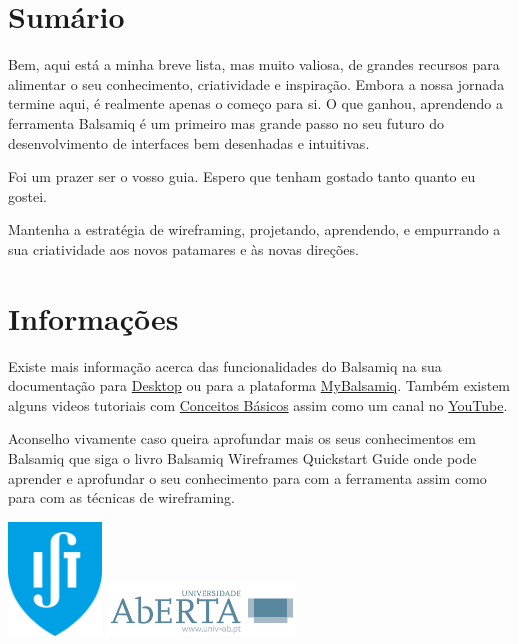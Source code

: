 \documentclass{tufte-book} %
\begin{document}
\chapter{Sumário}

Bem, aqui está a minha breve lista, mas muito valiosa, de grandes recursos para alimentar o seu conhecimento, criatividade e inspiração. Embora a nossa jornada termine aqui, é realmente apenas o começo para si. O que ganhou, aprendendo a ferramenta Balsamiq é um primeiro mas grande passo no seu futuro do desenvolvimento de interfaces bem desenhadas e intuitivas.

Foi um prazer ser o vosso guia. Espero que tenham gostado tanto quanto eu gostei.

Mantenha a estratégia de wireframing, projetando, aprendendo, e empurrando a sua criatividade aos novos patamares e às novas direções.

\chapter{Informações}

Existe mais informação acerca das funcionalidades do Balsamiq na sua documentação para \href{https://docs.balsamiq.com/desktop/}{Desktop} ou para a plataforma \href{https://docs.balsamiq.com/mybalsamiq/}{MyBalsamiq}. Também existem alguns videos tutoriais com \href{https://support.balsamiq.com/tutorials/}{Conceitos Básicos} assim como um canal no \href{https://www.youtube.com/balsamiq/}{YouTube}.

Aconselho vivamente caso queira aprofundar mais os seus conhecimentos em Balsamiq que siga o livro Balsamiq Wireframes Quickstart Guide \cite{faranello2012balsamiq} onde pode aprender e aprofundar o seu conhecimento para com a ferramenta assim como para com as técnicas de wireframing.

\vspace{2.5cm}

\begin{center}
	\includegraphics[width=2.5cm]{../assets/ist_logo.png}
	\hfill
	\includegraphics[width=5cm]{../assets/uab_logo.png}
\end{center}
\end{document}
